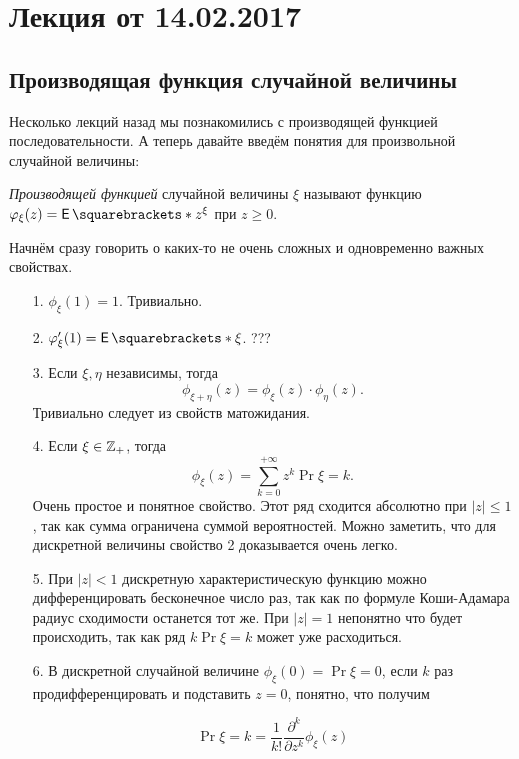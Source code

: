 \section{Лекция от 14.02.2017}

\subsection{Производящая функция случайной величины}

Несколько лекций назад мы познакомились с производящей функцией
последовательности. А теперь давайте введём понятия для произвольной случайной
величины:

\begin{definition}
  \textit{Производящей функцией} случайной величины $\xi$ называют
  функцию $\phi_{\xi}(z) = \E{z^{\xi}}$ при $z \geqslant 0$.
\end{definition}

Начнём сразу говорить о каких-то не очень сложных и одновременно важных
свойствах.

\begin{itemize}
  \item[1.] $\phi_{\xi}(1) = 1$. Тривиально.
  \item[2.] $\phi_{\xi}'(1) = \E{\xi}$. ???
  \item[3.] Если $\xi, \eta$ независимы, тогда
  \[
    \phi_{\xi + \eta}(z) = \phi_{\xi}(z) \cdot \phi_{\eta}(z).
  \]
  Тривиально следует из свойств матожидания.
  \item[4.] Если $\xi \in \mathbb{Z}_+$, тогда 
  \[
    \phi_{\xi}(z) = \sum\limits_{k = 0}^{+\infty} z^k\Pr{\xi = k}.
  \]
  Очень простое и понятное свойство. Этот ряд сходится абсолютно при $|z| \leq 1$,
  так как сумма ограничена суммой вероятностей.
  Можно заметить, что для дискретной величины свойство 2 доказывается очень легко.

  \item[5.] При $|z| < 1$ дискретную характеристическую функцию
  можно дифференцировать
  бесконечное число раз, так как по формуле Коши-Адамара радиус
  сходимости останется тот же. При $|z| = 1$ непонятно что будет происходить, так
  как ряд $k\Pr{\xi = k}$ может уже расходиться.

  \item[6.] В дискретной случайной величине $\phi_{\xi}(0) = \Pr{\xi = 0}$, если
  $k$ раз продифференцировать и подставить $z = 0$, понятно, что получим

  \[
    \Pr{\xi = k} = \frac{1}{k!}\frac{\partial^k}{\partial z^k}\phi_{\xi}(z)
  \]
\end{itemize}

